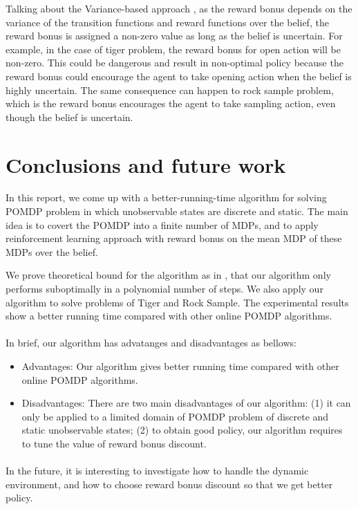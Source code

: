 \documentclass{article}
\begin{document}
Talking about the Variance-based approach \cite{sorg}, as the reward bonus depends on the variance of the
transition functions and reward functions over the belief, the reward bonus is assigned a
non-zero value as long as the belief is uncertain. For example, in the case of tiger
problem, the reward bonus for open action will be non-zero. This could be dangerous and result
in non-optimal policy because the reward bonus could encourage the agent to take opening action
when the belief is highly uncertain. The same consequence can happen to rock sample problem,
which is the reward bonus encourages the agent to take sampling action, even though the belief
is uncertain.

\section{Conclusions and future work}

In this report, we come up with a better-running-time algorithm for solving POMDP problem in which unobservable states are discrete and static. The main idea is 
to covert the POMDP into a finite number of MDPs, and to apply reinforcement learning
approach with reward bonus on the mean MDP of these MDPs over the belief.

We prove theoretical bound for the algorithm as in \cite{kolter}, that our algorithm only
performs suboptimally in a polynomial number of steps. We also apply our algorithm to solve
problems of Tiger and Rock Sample. The experimental results show a better running time 
compared with other online POMDP algorithms.

\paragraph{} In brief, our algorithm has advatanges and disadvantages as bellows:
\begin{itemize}
\item Advantages: Our algorithm gives better running time compared with
other online POMDP algorithms.
\item Disadvantages: There are two main disadvantages of our algorithm: (1)
it can only be applied to a limited domain of POMDP problem of discrete and 
static unobservable states; (2) to obtain good policy, our algorithm requires
to tune the value of reward bonus discount.
\end{itemize}

\paragraph{} In the future, it is interesting to investigate how to handle the dynamic environment, and how to choose reward bonus discount so that we get better policy.
\end{document}
